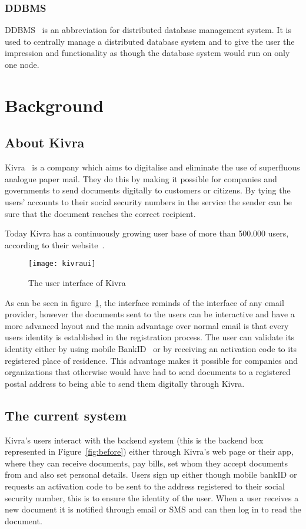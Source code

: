 \documentclass[a4paper,12pt]{article}
\begin{document}
\subsubsection{DDBMS}
DDBMS~\cite{DDBMS} is an abbreviation for distributed database management system. It is used to centrally manage a distributed database system and to give the user the impression and functionality as though the database system 
would run on only one node.

\newpage
\section{Background}
\subsection{About Kivra}
Kivra~\cite{KIVRA} is a company which aims to digitalise and eliminate the use of superfluous analogue paper mail. 
They do this by making it possible for companies and governments to send documents digitally to customers or citizens. 
By tying the users' accounts to their social security numbers in the service the sender can be sure that the document 
reaches the correct recipient. 

Today Kivra has a continuously growing user base of more than 500.000 users, according to their website~\cite{KIVRA}. 

\begin{figure}[h!]
    \vspace{0.25in}
    \centerline{\texttt{[image: kivraui]}}
    \caption{The user interface of Kivra}
    \label{fig:ui}
\end{figure}

As can be seen in figure~\ref{fig:ui}, the interface reminds of the interface of any email provider, however the documents sent to the users can be interactive and have a more advanced layout and the main advantage over normal email is that every 
users identity is established in the registration process. 
The user can validate its identity either by using mobile BankID~\cite{BANKID} or by receiving an activation code to its registered place of residence. 
This advantage makes it possible for companies and organizations that otherwise would have had to send documents to a registered postal address to being able to send them digitally through Kivra. 


\subsection{The current system}
Kivra's users interact with the backend system (this is the backend box represented in Figure~\ref{fig:before}) either through Kivra's web page or their app, where they can receive documents, pay bills, set whom they accept documents from and also set personal details. 
Users sign up either though mobile bankID or requests an activation code to be sent to the address registered to their social security number, this is to ensure the identity of the user. 
When a user receives a new document it is notified through email or SMS and can then log in to read the document. 
\end{document}
